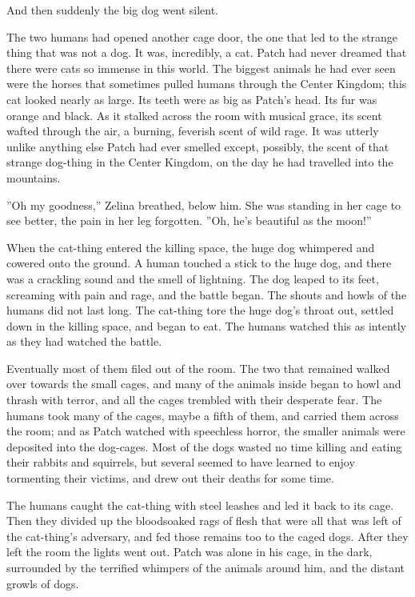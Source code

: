 \documentclass[11pt]{article}
\begin{document}
 And then suddenly the big dog went silent.\par
The two humans had opened another cage door, the one that led to the strange thing that was not a dog. It was, incredibly, a cat. Patch had never dreamed that there were cats so immense in this world. The biggest animals he had ever seen were the horses that sometimes pulled humans through the Center Kingdom; this cat looked nearly as large. Its teeth were as big as Patch's head. Its fur was orange and black. As it stalked across the room with musical grace, its scent wafted through the air, a burning, feverish scent of wild rage. It was utterly unlike anything else Patch had ever smelled %
 except, possibly, the scent of that strange dog-thing in the Center Kingdom, on the day he had travelled into the mountains.\par
 ''Oh my goodness,'' Zelina breathed, below him. She was standing in her cage to see better, the pain in her leg forgotten. ''Oh, he's beautiful as the moon!''\par
 When the cat-thing entered the killing space, the huge dog whimpered and cowered onto the ground. A human touched a stick to the huge dog, and there was a crackling sound and the smell of lightning. The dog leaped to its feet, screaming with pain and rage, and the battle began. The shouts and howls of the humans did not last long. The cat-thing tore the huge dog's throat out, settled down in the killing space, and began to eat. The humans watched this as intently as they had watched the battle.\par
 Eventually most of them filed out of the room. The two that remained walked over towards the small cages, and many of the animals inside began to howl and thrash with terror, and all the cages trembled with their desperate fear. The humans took many of the cages, maybe a fifth of them, and carried them across the room; and as Patch watched with speechless horror, the smaller animals were deposited into the dog-cages. Most of the dogs wasted no time killing and eating their rabbits and squirrels, but several seemed to have learned to enjoy tormenting their victims, and drew out their deaths for some time.\par
 The humans caught the cat-thing with steel leashes and led it back to its cage. Then they divided up the bloodsoaked rags of flesh that were all that was left of the cat-thing's adversary, and fed those remains too to the caged dogs. After they left the room the lights went out. Patch was alone in his cage, in the dark, surrounded by the terrified whimpers of the animals around him, and the distant growls of dogs.\par
\end{document}
